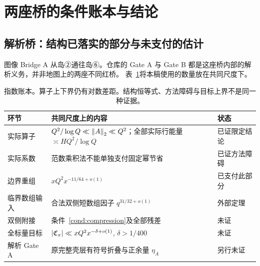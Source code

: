\section{两座桥的条件账本与结论}\label{sec:bridges}
\subsection{解析桥：结构已落实的部分与未支付的估计}
图像 Bridge A 从岛②通往岛⑥。仓库的 Gate A 与 Gate B 都是这座桥内部的解析义务，并非地图上的两座不同红桥。
表~\ref{tab:ledger}将本稿使用的数量放在共同尺度下。
\begin{table}[htbp]
\centering\small
\begin{tabularx}{\linewidth}{@{}lXl@{}}
\toprule
环节 & 共同尺度上的内容 & 状态\\\midrule
实际算子 & $Q^2/\log Q\ll\left\|A\right\|_2\ll Q^2$；全部实际行能量 $\asymp HQ^2/\log Q$ & 已证限定结论\\
实际系数 & 范数乘积法不能单独支付固定幂节省 & 已证方法障碍\\
边界重组 & $xQ^2x^{-11/64+o(1)}$ & 已支付此部分\\
临界数组输入 & 合法双侧短数组因子 $q^{31/32+o(1)}$ & 外部定理\\
双侧附接 & 条件~\ref{cond:compression}及全部残差 & 未证\\
全标量目标 & $|\mathfrak C_x|\ll xQ^2x^{-\delta+o(1)}$, $\delta>1/400$ & 未证\\
解析 Gate A & 原完整壳层有符号折叠与正余量 $\eta_A$ & 另行未证\\
\bottomrule
\end{tabularx}
\caption{指数账本。算子上下界仍有对数差距。结构恒等式、方法障碍与目标上界不是同一种证据。}\label{tab:ledger}
\end{table}
